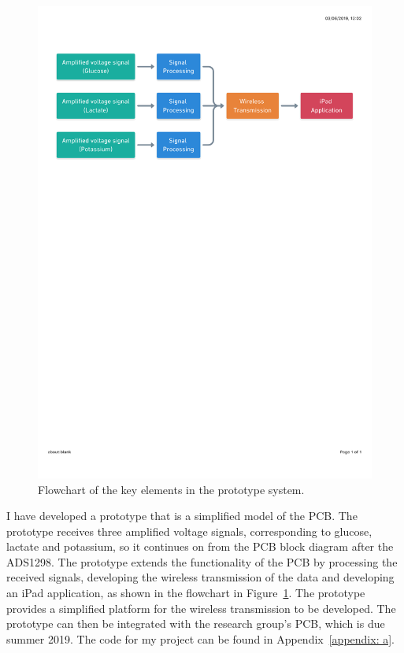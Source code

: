 \begin{figure}[b!]
\centering
\includegraphics[trim={0cm 19.5cm 0.5cm  2.5cm}, clip, width=1\textwidth]{./figures/Flowchart.pdf}
\captionsetup{justification=centering}
\caption{Flowchart of the key elements in the prototype system.}
\label{fig: flowchart}
\end{figure}

I have developed a prototype that is a simplified model of the PCB. The prototype receives three amplified voltage signals, corresponding to glucose, lactate and potassium, so it continues on from the PCB block diagram after the ADS1298. The prototype extends the functionality of the PCB by processing the received signals, developing the wireless transmission of the data and developing an iPad application, as shown in the flowchart in Figure~\ref{fig: flowchart}. The prototype provides a simplified platform for the wireless transmission to be developed. The prototype can then be integrated with the research group's PCB, which is due summer 2019. The code for my project can be found in Appendix~\ref{appendix: a}.



